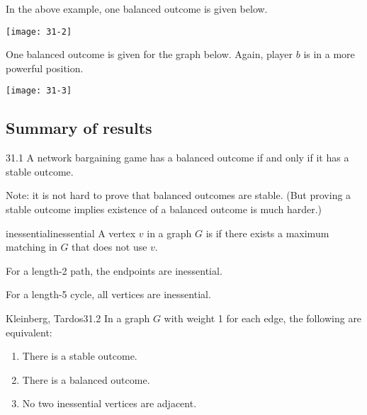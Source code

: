 \documentclass[12pt,letterpaper]{report}
\begin{document}
\begin{ex}
  In the above example, one balanced outcome is given below.

  \begin{center}
    \texttt{[image: 31-2]}
  \end{center}
\end{ex}

\begin{ex}
  One balanced outcome is given for the graph below.
  Again, player $b$ is in a more powerful position.

  \begin{center}
    \texttt{[image: 31-3]}
  \end{center}
\end{ex}

\subsection{Summary of results}

\begin{thm}{}{31.1}
  A network bargaining game has a balanced outcome if and only if it has a stable outcome.
\end{thm}

Note: it is not hard to prove that balanced outcomes are stable.
(But proving a stable outcome implies existence of a balanced outcome is much harder.)

\begin{defn}{inessential}{inessential}
  A vertex $v$ in a graph $G$ is  if there exists a maximum matching in $G$ that
  does not use $v$.
\end{defn}

\begin{ex}
  For a length-2 path, the endpoints are inessential.

  For a length-5 cycle, all vertices are inessential.
\end{ex}

\begin{thm}{Kleinberg, Tardos}{31.2}
  In a graph $G$ with weight 1 for each edge, the following are equivalent:
  \begin{enumerate}
    \item There is a stable outcome.
    \item There is a balanced outcome.
    \item No two inessential vertices are adjacent.
  \end{enumerate}
\end{thm}
\end{document}
